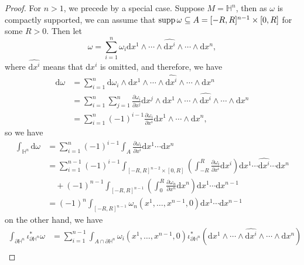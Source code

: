 \documentclass[../main.tex]{subfiles}
\begin{document}
\begin{proof}
  For $n>1$, we precede by a special case. Suppose $M = \mathbb{H}^n$, then as $\omega$ is compactly supported, we can assume that $\operatorname{supp} \omega \subseteq A = [-R,R]^{n-1} \times [0,R]$ for some $R > 0$. Then let
  \begin{equation*}
    \omega = \sum_{i=1}^n \omega_i \mathrm{d} x^1 \wedge \cdots \wedge \widehat{\mathrm{d} x^i} \wedge \cdots \wedge \mathrm{d} x^n,
  \end{equation*}
  where $\widehat{\mathrm{d} x^i}$ means that $\mathrm{d} x^i$ is omitted, and therefore, we have
  \begin{equation*}
    \begin{aligned}
      \mathrm{d} \omega &= \sum_{i=1}^n \mathrm{d} \omega_i \wedge \mathrm{d} x^1 \wedge \cdots \wedge \widehat{\mathrm{d} x^i} \wedge \cdots \wedge \mathrm{d} x^n\\
      &= \sum_{i=1}^n \sum_{j=1}^n \frac{\partial \omega_i}{\partial x^j} \mathrm{d} x^j \wedge \mathrm{d} x^1 \wedge \cdots \wedge \widehat{\mathrm{d} x^i} \wedge \cdots \wedge \mathrm{d} x^n\\
      &= \sum_{i=1}^n (-1)^{i-1} \frac{\partial \omega_i}{\partial x^i} \mathrm{d} x^1 \wedge \cdots \wedge \mathrm{d} x^n,
    \end{aligned}
  \end{equation*}
  so we have
  \begin{equation*}
    \begin{aligned}
      \int_{\mathbb{H}^n} \mathrm{d} \omega &= \sum_{i=1}^n (-1)^{i-1} \int_A \frac{\partial \omega_i}{\partial x^i} \mathrm{d}x^1\cdots \mathrm{d}x^n\\
      &= \sum_{i=1}^{n-1} (-1)^{i-1} \int_{[-R,R]^{n-2} \times [0,R]} \left( \int_{-R}^R \frac{\partial \omega_i}{\partial x^i} \mathrm{d}x^i \right) \mathrm{d}x^1\cdots \widehat{\mathrm{d}x^i} \cdots \mathrm{d}x^n \\
      &\quad + (-1)^{n-1} \int_{[-R,R]^{n-1}} \left( \int_0^R \frac{\partial \omega_n}{\partial x^n} \mathrm{d}x^n \right) \mathrm{d}x^1\cdots \mathrm{d}x^{n-1}\\
      &= (-1)^n \int_{[-R,R]^{n-1}} \omega_n(x^1, \ldots , x^{n-1}, 0) \mathrm{d}x^1\cdots \mathrm{d}x^{n-1}
    \end{aligned}
  \end{equation*}
  on the other hand, we have
  \begin{equation*}
    \begin{aligned}
      \int_{\partial \mathbb{H}^n} \iota^*_{\partial \mathbb{H}^n} \omega &= \sum_{i=1}^{n-1} \int_{A \cap \partial \mathbb{H}^n} \omega_i(x^1, \ldots , x^{n-1}, 0) \iota^*_{\partial \mathbb{H}^n} \left( \mathrm{d} x^1 \wedge \cdots \wedge \widehat{\mathrm{d} x^i} \wedge \cdots \wedge \mathrm{d} x^n \right)\\

\end{aligned}
\end{equation*}
\end{proof}
\end{document}
